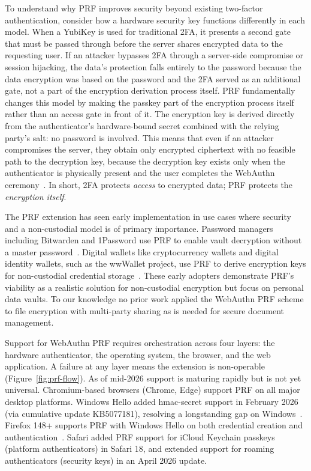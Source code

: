 To understand why PRF improves security beyond existing two-factor authentication, consider how a hardware security key functions differently in each model. When a YubiKey is used for traditional 2FA, it presents a second gate that must be passed through before the server shares encrypted data to the requesting user. If an attacker bypasses 2FA through a server-side compromise or session hijacking, the data's protection falls entirely to the password because the data encryption was based on the password and the 2FA served as an additional gate, not a part of the encryption derivation process itself. PRF fundamentally changes this model by making the passkey part of the encryption process itself rather than an access gate in front of it. The encryption key is derived directly from the authenticator's hardware-bound secret combined with the relying party's salt: no password is involved. This means that even if an attacker compromises the server, they obtain only encrypted ciphertext with no feasible path to the decryption key, because the decryption key exists only when the authenticator is physically present and the user completes the WebAuthn ceremony~\cite{bitwarden_prf_2024,yubico_prf_extension}. In short, 2FA protects \emph{access} to encrypted data; PRF protects the \emph{encryption itself}.

The PRF extension has seen early implementation in use cases where security and a non-custodial model is of primary importance. Password managers including Bitwarden\texttrademark{} and 1Password\texttrademark{} use PRF to enable vault decryption without a master password~\cite{bitwarden_prf_2024}. Digital wallets like cryptocurrency wallets and digital identity wallets, such as the wwWallet project, use PRF to derive encryption keys for non-custodial credential storage~\cite{yubico_prf_extension}. These early adopters demonstrate PRF's viability as a realistic solution for non-custodial encryption but focus on personal data vaults. To our knowledge no prior work applied the WebAuthn PRF scheme to file encryption with multi-party sharing as is needed for secure document management.

Support for WebAuthn PRF requires orchestration across four layers: the hardware authenticator, the operating system, the browser, and the web application. A failure at any layer means the extension is non-operable (Figure~\ref{fig:prf-flow}). As of mid-2026 support is maturing rapidly but is not yet universal. Chromium-based browsers (Chrome\texttrademark{}, Edge\texttrademark{}) support PRF on all major desktop platforms. Windows Hello added hmac-secret support in February 2026 (via cumulative update KB5077181), resolving a longstanding gap on Windows~\cite{corbado_prf_2026}. Firefox\texttrademark{} 148+ supports PRF with Windows Hello on both credential creation and authentication~\cite{corbado_prf_2026}. Safari\texttrademark{} added PRF support for iCloud\textregistered{} Keychain passkeys (platform authenticators) in Safari 18, and extended support for roaming authenticators (security keys) in an April 2026 update.

